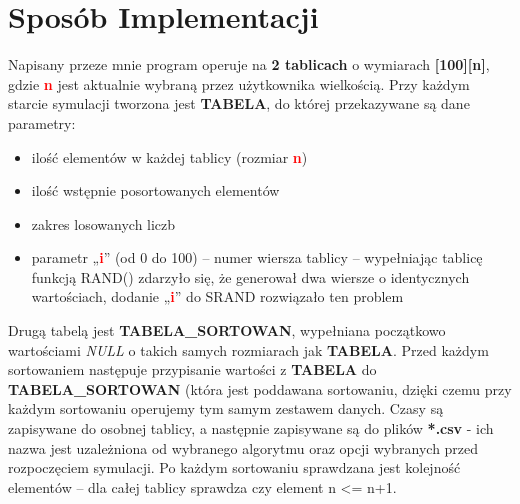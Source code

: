 \documentclass[12pt,a4paper,oneside]{article}
\begin{document}
\section{Sposób Implementacji}
Napisany przeze mnie program operuje na \textbf{2 tablicach} o wymiarach \textbf{[100][n]}, gdzie \textbf{\textcolor{red}{n}} jest aktualnie wybraną przez użytkownika wielkością. Przy każdym starcie symulacji tworzona jest \textbf{TABELA}, do której przekazywane są dane parametry:
\begin{itemize}
	\item ilość elementów w każdej tablicy (rozmiar \textbf{\textcolor{red}{n}})
	\item ilość wstępnie posortowanych elementów
	\item zakres losowanych liczb
	\item parametr „\textbf{\textcolor{red}{i}}” (od 0 do 100) – numer wiersza tablicy – wypełniając tablicę funkcją  RAND() zdarzyło się, że generował dwa wiersze o identycznych wartościach, dodanie „\textbf{\textcolor{red}{i}}” do SRAND rozwiązało ten problem
\end{itemize}
Drugą tabelą jest \textbf{TABELA\_SORTOWAN}, wypełniana początkowo wartościami \textit{NULL} o takich samych rozmiarach jak \textbf{TABELA}. Przed każdym sortowaniem następuje przypisanie wartości z \textbf{TABELA} do \textbf{TABELA\_SORTOWAN} (która jest poddawana sortowaniu, dzięki czemu przy każdym sortowaniu operujemy tym samym zestawem danych. Czasy są zapisywane do osobnej tablicy, a następnie zapisywane są do plików \textbf{*.csv} - ich nazwa jest uzależniona od wybranego algorytmu oraz opcji wybranych przed rozpoczęciem symulacji. Po każdym sortowaniu sprawdzana jest kolejność elementów – dla całej tablicy sprawdza czy element n <= n+1.
\end{document}
